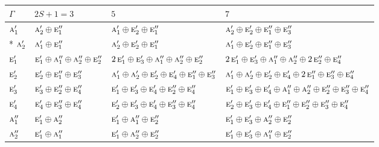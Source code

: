 \documentclass[10pt,a4paper]{article}
\numberwithin{equation}{section}
\newcommand{\irr}[1]{\text{\normalfont\scshape #1}}
\begin{document}
{\small\setlength{\tabcolsep}{3pt}\begin{longtable}{@{}l>{\RaggedRight\arraybackslash}p{}>{\RaggedRight\arraybackslash}p{}>{\RaggedRight\arraybackslash}p{}@{}}\toprule
$\Gamma$ & $2S + 1 = 3$ & $5$ & $7$\\\midrule\endhead
\bottomrule\endfoot\endlastfoot
$\irr{a}_{1}'$ & $\irr{a}_{2}'\oplus \irr{e}_{1}''$ & $\irr{a}_{1}'\oplus \irr{e}_{2}'\oplus \irr{e}_{1}''$ & $\irr{a}_{2}'\oplus \irr{e}_{2}'\oplus \irr{e}_{1}''\oplus \irr{e}_{3}''$\\*
$\irr{a}_{2}'$ & $\irr{a}_{1}'\oplus \irr{e}_{1}''$ & $\irr{a}_{2}'\oplus \irr{e}_{2}'\oplus \irr{e}_{1}''$ & $\irr{a}_{1}'\oplus \irr{e}_{2}'\oplus \irr{e}_{1}''\oplus \irr{e}_{3}''$\\
$\irr{e}_{1}'$ & $\irr{e}_{1}'\oplus \irr{a}_{1}''\oplus \irr{a}_{2}''\oplus \irr{e}_{2}''$ & $2\,\irr{e}_{1}'\oplus \irr{e}_{3}'\oplus \irr{a}_{1}''\oplus \irr{a}_{2}''\oplus \irr{e}_{2}''$ & $2\,\irr{e}_{1}'\oplus \irr{e}_{3}'\oplus \irr{a}_{1}''\oplus \irr{a}_{2}''\oplus 2\,\irr{e}_{2}''\oplus \irr{e}_{4}''$\\
$\irr{e}_{2}'$ & $\irr{e}_{2}'\oplus \irr{e}_{1}''\oplus \irr{e}_{3}''$ & $\irr{a}_{1}'\oplus \irr{a}_{2}'\oplus \irr{e}_{2}'\oplus \irr{e}_{4}'\oplus \irr{e}_{1}''\oplus \irr{e}_{3}''$ & $\irr{a}_{1}'\oplus \irr{a}_{2}'\oplus \irr{e}_{2}'\oplus \irr{e}_{4}'\oplus 2\,\irr{e}_{1}''\oplus \irr{e}_{3}''\oplus \irr{e}_{4}''$\\
$\irr{e}_{3}'$ & $\irr{e}_{3}'\oplus \irr{e}_{2}''\oplus \irr{e}_{4}''$ & $\irr{e}_{1}'\oplus \irr{e}_{3}'\oplus \irr{e}_{4}'\oplus \irr{e}_{2}''\oplus \irr{e}_{4}''$ & $\irr{e}_{1}'\oplus \irr{e}_{3}'\oplus \irr{e}_{4}'\oplus \irr{a}_{1}''\oplus \irr{a}_{2}''\oplus \irr{e}_{2}''\oplus \irr{e}_{3}''\oplus \irr{e}_{4}''$\\
$\irr{e}_{4}'$ & $\irr{e}_{4}'\oplus \irr{e}_{3}''\oplus \irr{e}_{4}''$ & $\irr{e}_{2}'\oplus \irr{e}_{3}'\oplus \irr{e}_{4}'\oplus \irr{e}_{3}''\oplus \irr{e}_{4}''$ & $\irr{e}_{2}'\oplus \irr{e}_{3}'\oplus \irr{e}_{4}'\oplus \irr{e}_{1}''\oplus \irr{e}_{2}''\oplus \irr{e}_{3}''\oplus \irr{e}_{4}''$\\
$\irr{a}_{1}''$ & $\irr{e}_{1}'\oplus \irr{a}_{2}''$ & $\irr{e}_{1}'\oplus \irr{a}_{1}''\oplus \irr{e}_{2}''$ & $\irr{e}_{1}'\oplus \irr{e}_{3}'\oplus \irr{a}_{2}''\oplus \irr{e}_{2}''$\\
$\irr{a}_{2}''$ & $\irr{e}_{1}'\oplus \irr{a}_{1}''$ & $\irr{e}_{1}'\oplus \irr{a}_{2}''\oplus \irr{e}_{2}''$ & $\irr{e}_{1}'\oplus \irr{e}_{3}'\oplus \irr{a}_{1}''\oplus \irr{e}_{2}''$\\

\end{longtable}}
\end{document}
